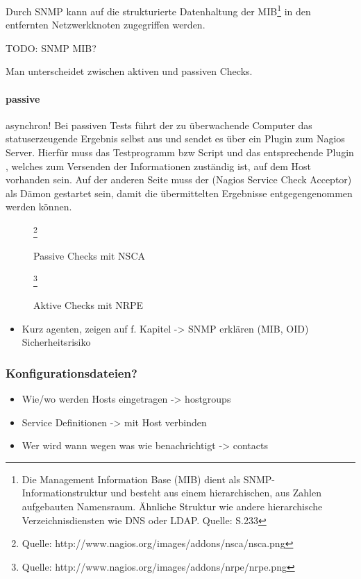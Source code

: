 Durch SNMP kann auf die strukturierte Datenhaltung der MIB\footnote{Die Management Information Base (MIB) dient als SNMP-Informationstruktur und besteht aus einem hierarchischen, aus Zahlen aufgebauten Namensraum. Ähnliche Struktur wie andere hierarchische Verzeichnisdiensten wie DNS oder LDAP. Quelle: \cite{Barth08} S.233} in den entfernten Netzwerkknoten zugegriffen werden.

\begin{center}
TODO: SNMP MIB?
\end{center}



Man unterscheidet zwischen aktiven und passiven Checks.
\paragraph{passive}
asynchron!
Bei passiven Tests führt der zu überwachende Computer das statuserzeugende Ergebnis selbst aus und sendet es über ein Plugin zum Nagios Server.
Hierfür muss das Testprogramm bzw Script und das entsprechende Plugin , welches zum Versenden der Informationen zuständig ist, auf dem Host vorhanden sein.
Auf der anderen Seite muss der  (Nagios Service Check Acceptor) als Dämon gestartet sein, damit die übermittelten Ergebnisse entgegengenommen werden können.
\begin{figure}[ht]
	\centering
		\caption{Passive Checks mit NSCA}\footnote{Quelle: http://www.nagios.org/images/addons/nsca/nsca.png}
		\label{passivchecks}
\end{figure}


\begin{figure}[ht]
	\centering
		\caption{Aktive Checks mit NRPE}\footnote{Quelle: http://www.nagios.org/images/addons/nrpe/nrpe.png}
		\label{aktivchecks}
\end{figure}
\begin{itemize}
\item Kurz agenten, zeigen auf f. Kapitel -> SNMP erklären (MIB, OID) Sicherheitsrisiko
\end{itemize}

\subsubsection{Konfigurationsdateien?}
\begin{itemize}
\item Wie/wo werden Hosts eingetragen -> hostgroups
\item Service Definitionen -> mit Host verbinden
\item Wer wird wann wegen was wie benachrichtigt -> contacts
\end{itemize}